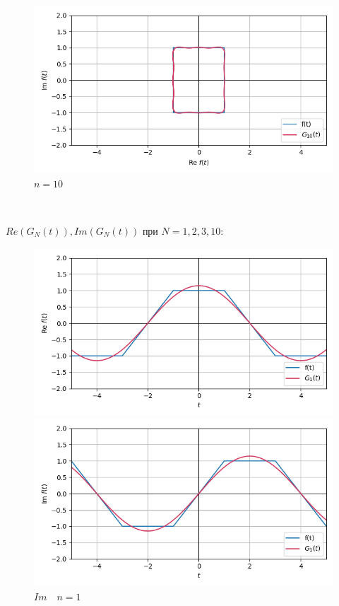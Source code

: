 \documentclass[a4paper]{article}
\begin{document}
\begin{figure}[H]
\begin{minipage}{0.5\textwidth}
        \caption{$n = 3$}
    \end{minipage}\hfill
    \begin{minipage}{0.5\textwidth}
        \centering \includegraphics[width=\textwidth]{parametric_func/10.png}
        \caption{$n = 10$}
    \end{minipage}
\end{figure}\noindent\

$Re(G_N(t)), Im(G_N(t))$ при $N = 1, 2, 3, 10$:\

\begin{figure}[H]
    \begin{minipage}{0.5\textwidth}
        \centering \includegraphics[width=\textwidth]{parametric_func/Re1.png}
        \caption{$Re\quad n = 1$}
    \end{minipage}\hfill
    \begin{minipage}{0.5\textwidth}
        \centering \includegraphics[width=\textwidth]{parametric_func/Im1.png}
        \caption{$Im\quad n = 1$}
    \end{minipage}
\end{figure}\
\end{document}
